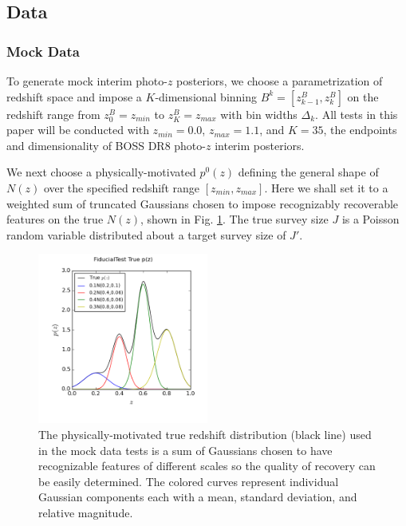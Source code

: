 \documentclass[preprint]{aastex}
\begin{document}
\clearpage
\subsection{Data}
\label{sec:alldata}

\clearpage
\subsubsection{Mock Data}
\label{sec:mock}

To generate mock interim photo-$z$ posteriors, we choose a parametrization of 
redshift space and impose a $K$-dimensional binning 
$B^{k}=[z^{B}_{k-1},z^{B}_{k}]$ on the redshift range from $z^{B}_{0}=z_{min}$ 
to $z^{B}_{K}=z_{max}$ with bin widths $\Delta_{k}$.  All tests in this paper 
will be conducted with $z_{min}=0.0$, $z_{max}=1.1$, and $K=35$, the endpoints 
and dimensionality of BOSS DR8 photo-$z$ interim posteriors.

We next choose a physically-motivated $p^{0}(z)$ defining the general shape of 
$N(z)$ over the specified redshift range $[z_{min},z_{max}]$.  Here we shall 
set it to a weighted sum of truncated Gaussians chosen to impose recognizably 
recoverable features on the true $N(z)$, shown in Fig. \ref{fig:physpz}.  The 
true survey size $J$ is a Poisson random variable distributed about a target 
survey size of $J'$.

\begin{figure}
\includegraphics[width=0.5\textwidth]{figs/null/physPz.png}
\caption{The physically-motivated true redshift distribution (black line) used 
in the mock data tests is a sum of Gaussians chosen to have recognizable 
features of different scales so the quality of recovery can be easily 
determined.  The colored curves represent individual Gaussian components each 
with a mean, standard deviation, and relative magnitude.}
\label{fig:physpz}
\end{figure}
\end{document}
